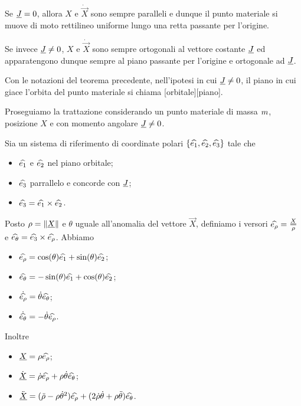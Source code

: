 \Proof Se $\underline{J} = 0$, allora $X$ e $\dot{\vec{X}}$ sono sempre paralleli e dunque il punto materiale si muove di moto rettilineo uniforme lungo una retta passante per l'origine.
\par Se invece $\underline{J} \neq 0$, $X$ e $\dot{\vec{X}}$ sono sempre ortogonali al vettore costante $\underline{J}$ ed apparatengono dunque sempre al piano passante per l'origine e ortogonale ad $\underline{J}$. \EndProof
\begin{Definition}
	Con le notazioni del teorema precedente, nell'ipotesi in cui $\underline{J} \neq 0$, il piano in cui giace l'orbita del punto materiale si chiama [orbitale][piano].
\end{Definition}
\par  Proseguiamo la trattazione considerando un punto materiale di massa $m$, posizione $X$ e con momento angolare $\underline{J} \neq 0$.
\begin{Theorem}
	Sia un sistema di riferimento di coordinate polari $\lbrace \widehat{e_1}, \widehat{e_2}, \widehat{e_3} \rbrace$ tale che
\begin{itemize}
	\item $\widehat{e_1}$ e $\widehat{e_2}$ nel piano orbitale;
	\item $\widehat{e_3}$ parrallelo e concorde con $\underline{J}$;
	\item $\widehat{e_3} = \widehat{e_1} \times \widehat{e_2}$.
\end{itemize}
	Posto $\rho = \Norm{\vec{X}}$ e $\theta$ uguale all'anomalia del vettore $\vec{X}$, definiamo i versori $\widehat{e_\rho} = \frac{\underline{X}}{\rho}$ e $\widehat{e_\theta} = \widehat{e_3} \times \widehat{e_\rho}$. Abbiamo
	\begin{itemize}
		\item $\widehat{e_\rho} = \cos(\theta) \widehat{e_1} + \sin(\theta)\widehat{e_2}$;
		\item $\widehat{e_\theta} = - \sin(\theta) \widehat{e_1} + \cos(\theta)\widehat{e_2}$;
		\item $\dot{\widehat{e_\rho}} = \dot{\theta} \widehat{e_\theta}$;
		\item $\dot{\widehat{e_\theta}} = - \dot{\theta} \widehat{e_\rho}$.
	\end{itemize}
	Inoltre
	\begin{itemize}
		\item $\underline{X} = \rho \widehat{e_\rho}$;
		\item $\dot{\underline{X}} = \dot{\rho} \widehat{e_\rho} + \rho \dot{\theta} \widehat{e_\theta}$;
		\item $\ddot{\underline{X}} = (\ddot{\rho} - \rho \dot{\theta}^2) \widehat{e_\rho} + (2 \dot{\rho} \dot{\theta} + \rho \ddot{\theta}) \widehat{e_\theta}$.
	\end{itemize}
\end{Theorem}
